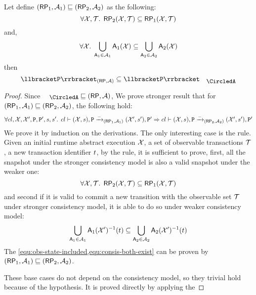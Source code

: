 \begin{proposition}
\label{prop:aexec-semantics-mono}
Let define \( (\mathsf{RP}_1, \mathcal{A}_1) \sqsubseteq (\mathsf{RP}_2, \mathcal{A}_2) \) as the following:
\[
    \forall \mathcal{X},\mathcal{T} \ldotp \; \mathsf{RP}_2(\mathcal{X},\mathcal{T}) \subseteq \mathsf{RP}_1(\mathcal{X},\mathcal{T})
\]
and,
\[
    \forall \mathcal{X} \ldotp \; \bigcup\limits_{\mathsf{A}_1 \in \mathcal{A}_1}\mathsf{A}_1(\mathcal{X}) \subseteq \bigcup\limits_{\mathsf{A}_2 \in \mathcal{A}_2}\mathsf{A}_2(\mathcal{X})
\]
then
\[ \interpr{\prog}_{(\RP, \Ax)} \subseteq \interpr{\prog}_{\anarchic} \]
\end{proposition}
\begin{proof}
    Since \( \anarchic \sqsubseteq (\RP, \Ax) \),
    We prove stronger result that for \( (\mathsf{RP}_1, \mathcal{A}_1) \sqsubseteq  (\mathsf{RP}_2, \mathcal{A}_2)\),
    the following  hold:
    \[
        \begin{array}{@{}l@{}}
            \fora{\cl, \aexec, \aexec', \prog, \prog', \stk, \stk'} 
            \cl \vdash ( \aexec, \stk ), \prog \toA{\stub}_{(\RP_1, \Ax_1)} ( \aexec', \stk' ), \prog' 
            \implies \cl \vdash ( \aexec, \stk ), \prog \toA{\stub}_{(\RP_2, \Ax_2)} ( \aexec', \stk' ), \prog' \\
        \end{array}
    \]
    We prove it by induction on the derivations.
    The only interesting case is the  rule.
    Given an initial runtime abstract execution \( \mathcal{X} \),
    a set of observable transactions \( \mathcal{T} \),
    a new transaction identifier \( t \),
    by the  rule, it is sufficient to prove, 
    first, all the snapshot under the stronger consistency model is also a valid snapshot under the weaker one:
    \begin{equation}
        \label{equ:obs-state-included}
        \forall \mathcal{X},\mathcal{T} \ldotp \; \mathsf{RP}_2(\mathcal{X},\mathcal{T}) \subseteq  \mathsf{RP}_1(\mathcal{X},\mathcal{T})
    \end{equation}
    and second if it is valid  to commit a new transition with the observable set \( \mathcal{T} \) under stronger consistency model,
    it is able to do so under weaker consistency model:
    \begin{equation}
        \label{equ:consis-both-exist}
        \bigcup\limits_{\mathsf{A}_1 \in \mathcal{A}_1}\mathsf{A}_1(\mathcal{X}')^{-1}(t) \subseteq \bigcup\limits_{\mathsf{A}_2 \in \mathcal{A}_2}\mathsf{A}_2(\mathcal{X}')^{-1}(t)
    \end{equation}
    The \cref{equ:obs-state-included,equ:consis-both-exist} can be proven by \( (\mathsf{RP}_1, \mathcal{A}_1) \sqsubseteq  (\mathsf{RP}_2, \mathcal{A}_2) \).

    These base cases do not depend on the consistency model, so they trivial hold because of the hypothesis.
    It is proved directly by applying the \ih
\end{proof}
